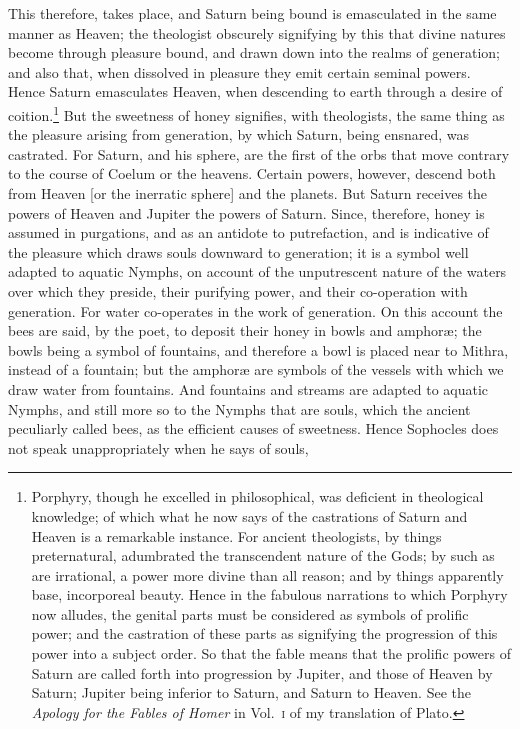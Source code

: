 \documentclass[12pt]{article}
\begin{document}
\noindent This therefore, takes place, and Saturn being bound is emasculated in
the same manner as Heaven; the theologist obscurely signifying by this that
divine natures become through pleasure bound, and drawn down into the realms of
generation; and also that, when dissolved in pleasure they emit certain seminal
powers. Hence Saturn emasculates Heaven, when descending to earth through a
desire of coition.\footnote{Porphyry, though he excelled in philosophical, was
deficient in theological knowledge; of which what he now says of the
castrations of Saturn and Heaven is a remarkable instance. For ancient
theologists, by things preternatural, adumbrated the transcendent nature of the
Gods; by such as are irrational, a power more divine than all reason; and by
things apparently base, incorporeal beauty. Hence in the fabulous narrations to
which Porphyry now alludes, the genital parts must be considered as symbols of
prolific power; and the castration of these parts as signifying the progression
of this power into a subject order. So that the fable means that the prolific
powers of Saturn are called forth into progression by Jupiter, and those of
Heaven by Saturn; Jupiter being inferior to Saturn, and Saturn to Heaven. See
the \textit{Apology for the Fables of Homer} in Vol.~\textsc{i} of my
translation of Plato.} But the sweetness of honey signifies, with theologists,
the same thing as the pleasure arising from generation, by which Saturn, being
ensnared, was castrated. For Saturn, and his sphere, are the first of the orbs
that move contrary to the course of Coelum or the heavens. Certain powers,
however, descend both from Heaven [or the inerratic sphere] and the planets.
But Saturn receives the powers of Heaven and Jupiter the powers of Saturn.
Since, therefore, honey is assumed in purgations, and as an antidote to
putrefaction, and is indicative of the pleasure which draws souls downward to
generation; it is a symbol well adapted to aquatic Nymphs, on account of the
unputrescent nature of the waters over which they preside, their purifying
power, and their co-operation with generation. For water co-operates in the
work of generation. On this account the bees are said, by the poet, to deposit
their honey in bowls and amphor{\ae}; the bowls being a symbol of fountains,
and therefore a bowl is placed near to Mithra, instead of a fountain; but the
amphor{\ae} are symbols of the vessels with which we draw water from fountains.
And fountains and streams are adapted to aquatic Nymphs, and still more so to
the Nymphs that are souls, which the ancient peculiarly called bees, as the
efficient causes of sweetness. Hence Sophocles does not speak unappropriately
when he says of souls,
\end{document}
